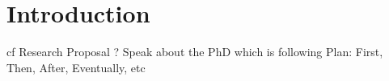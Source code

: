 \documentclass[twoside,10pt,openany,a4paper]{rapport}
\begin{document}
\mainmatter


\chapter{Introduction}
cf Research Proposal ?
Speak about the PhD which is following
Plan: First, Then, After, Eventually, etc











% 














\end{document}
